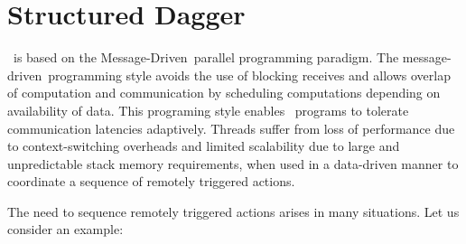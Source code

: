\section{Structured Dagger}

\newcommand{\sdag}{Structured Dagger}
\newcommand{\charm}{Charm}
\newcommand{\wb}{when-block}
\newcommand{\dagg}{Dagger}
\newcommand{\md}{message-driven}
\newcommand{\Md}{Message-driven}
\newcommand{\MD}{Message-Driven}

\charmpp\ is based on the \MD\ parallel programming paradigm.
The \md\ programming style avoids the use of blocking receives and
allows overlap of computation and communication by scheduling
computations depending on availability of data.  This programing style
enables \charmpp\ programs to
tolerate communication latencies adaptively. Threads suffer from loss of
performance due to context-switching overheads and limited scalability
due to large and unpredictable stack memory requirements, when used 
in a data-driven manner to
coordinate a sequence of remotely triggered actions.

The need to sequence remotely triggered actions
arises in many situations. Let us consider an example:

